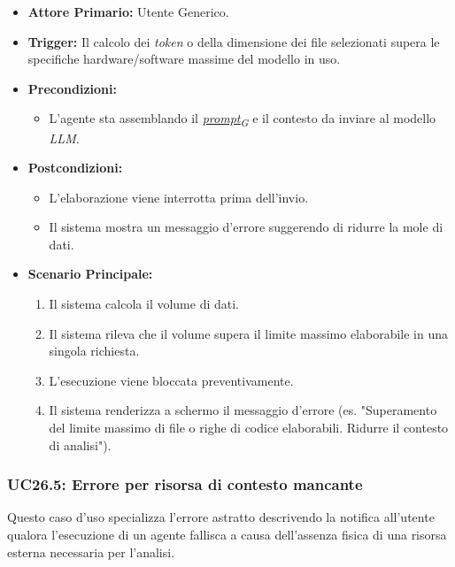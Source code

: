 \documentclass[12pt, a4paper]{article}
\newcommand{\urlglossario}{https://skynetunigroup.github.io/Code_Guardian/Documentazione/PB/glossario_v2.0.0.pdf} %
\newcommand{\glo}[2]{\href{\urlglossario\#nameddest=#2}{#1\textsubscript{G}}}
\begin{document}
\begin{itemize}
    \item \textbf{Attore Primario:} Utente Generico.
    \item \textbf{Trigger:} Il calcolo dei \textit{token} o della dimensione dei file selezionati supera le specifiche hardware/software massime del modello in uso.
    \item \textbf{Precondizioni:}
    \begin{itemize}
        \item L'agente sta assemblando il \textit{\glo{prompt}{prompt}} e il contesto da inviare al modello \textit{LLM}.
    \end{itemize}\newpage
    \item \textbf{Postcondizioni:}
    \begin{itemize}
        \item L'elaborazione viene interrotta prima dell'invio.
        \item Il sistema mostra un messaggio d'errore suggerendo di ridurre la mole di dati.
    \end{itemize}
    \item \textbf{Scenario Principale:}
    \begin{enumerate}
        \item Il sistema calcola il volume di dati.
        \item Il sistema rileva che il volume supera il limite massimo elaborabile in una singola richiesta.
        \item L'esecuzione viene bloccata preventivamente.
        \item Il sistema renderizza a schermo il messaggio d'errore (es. "Superamento del limite massimo di file o righe di codice elaborabili. Ridurre il contesto di analisi").
    \end{enumerate}
\end{itemize}

\subsubsection{UC26.5: Errore per risorsa di contesto mancante}\label{uc:26.5}
Questo caso d'uso specializza l'errore astratto descrivendo la notifica all'utente qualora l'esecuzione di un agente fallisca a causa dell'assenza fisica di una risorsa esterna necessaria per l'analisi.
\end{document}
